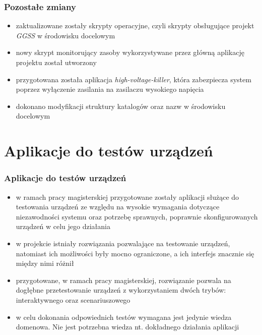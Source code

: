 \documentclass[10pt]{beamer}
\begin{document}
\begin{frame}
\frametitle{Pozostałe zmiany}
    \begin{itemize}
        \item zaktualizowane zostały skrypty operacyjne, czyli skrypty obsługujące projekt \emph{GGSS} w środowisku docelowym
        \item nowy skrypt monitorujący zasoby wykorzystywane przez główną aplikację projektu  został utworzony
        \item przygotowana została aplikacja \emph{high-voltage-killer}, która zabezpiecza system poprzez wyłączenie zasilania na zasilaczu wysokiego napięcia
        \item dokonano modyfikacji struktury katalogów oraz nazw w środowisku docelowym
    \end{itemize}
\end{frame}

\section{Aplikacje do testów urządzeń}

\begin{frame}
\frametitle{Aplikacje do testów urządzeń}
    \begin{itemize}
        \item w ramach pracy magisterskiej przygotowane zostały aplikacji służące do testowania urządzeń ze względu na wysokie wymagania dotyczące niezawodności systemu oraz potrzebę sprawnych, poprawnie skonfigurowanych urządzeń w celu jego działania
        \item w projekcie istniały rozwiązania pozwalające na testowanie urządzeń, natomiast ich możliwości były mocno ograniczone, a ich interfejs znacznie się między nimi różnił
        \item przygotowane, w ramach pracy magisterskiej, rozwiązanie pozwala na dogłębne przetestowanie urządzeń z wykorzystaniem dwóch trybów: interaktywnego oraz scenariuszowego
        \item w celu dokonania odpowiednich testów wymagana jest jedynie wiedza domenowa. Nie jest potrzebna wiedza nt. dokładnego działania aplikacji
    \end{itemize}
\end{frame}
\end{document}
